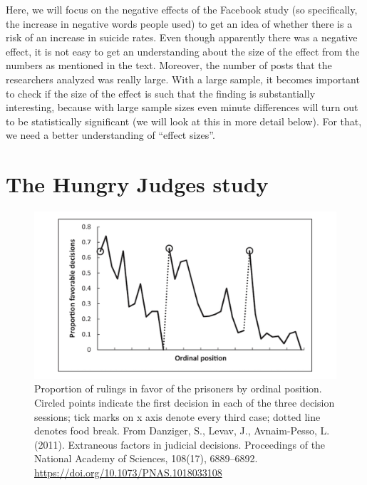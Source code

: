 \documentclass[
  oneside]{book}
\begin{document}
Here, we will focus on the negative effects of the Facebook study (so specifically, the increase in negative words people used) to get an idea of whether there is a risk of an increase in suicide rates. Even though apparently there was a negative effect, it is not easy to get an understanding about the size of the effect from the numbers as mentioned in the text. Moreover, the number of posts that the researchers analyzed was really large. With a large sample, it becomes important to check if the size of the effect is such that the finding is substantially interesting, because with large sample sizes even
minute differences will turn out to be statistically significant (we will look at this in more detail below). For that, we need a better understanding of ``effect sizes''.

\hypertarget{the-hungry-judges-study}{%
\section{The Hungry Judges study}\label{the-hungry-judges-study}}



\begin{figure}

{\centering \includegraphics[width=1\linewidth]{images/hungryjudges} 

}

\caption{Proportion of rulings in favor of the prisoners by ordinal position. Circled points indicate the first decision in each of the three decision sessions; tick marks on x axis denote every third case; dotted line denotes food break. From Danziger, S., Levav, J., Avnaim-Pesso, L. (2011). Extraneous factors in judicial decisions. Proceedings of the National Academy of Sciences, 108(17), 6889--6892. \url{https://doi.org/10.1073/PNAS.1018033108}}\label{fig:hungryjudges}
\end{figure}
\end{document}
